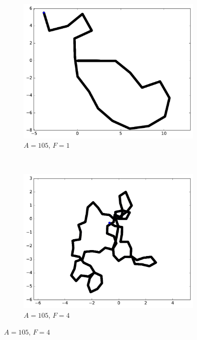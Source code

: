 \begin{appendices}
	\begin{figure}[htbp]
		\begin{subfigure}[t]{\subImgWmo}
			\centering
			\includegraphics[width=\textwidth]{figures/ch3/synTraj_219_105_1}
			\caption[$A = 105$, $F=1$]{$A = 105$, $F=1$}
			\label{fig:synTraj_219_105_1}
		\end{subfigure}
		~
		\begin{subfigure}[t]{\subImgWmo}
			\centering
			\includegraphics[width=\textwidth]{figures/ch3/synTraj_219_105_4}
			\caption[$A = 105$, $F=4$]{$A = 105$, $F=4$}
			\label{fig:synTraj_219_105_4}
		\end{subfigure}

\end{figure}
\end{appendices}
